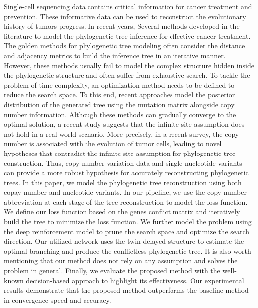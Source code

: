 {Single-cell sequencing data contains critical information for cancer treatment and prevention. These informative data can be used to reconstruct the evolutionary history of tumors progress. In recent years,  Several methods developed in the literature to model the phylogenetic tree inference for effective cancer treatment.  The golden methods for phylogenetic tree modeling often consider the distance and adjacency metrics to build the inference tree in an iterative manner. However, these methods usually fail to model the complex structure hidden inside the phylogenetic structure and often suffer from exhaustive search. To tackle the problem of time complexity, an optimization method needs to be defined to reduce the search space. To this end, recent approaches model the posterior distribution of the generated tree using the mutation matrix alongside copy number information. Although these methods can gradually converge to the optimal solution, a recent study suggests that the infinite site assumption does not hold in a real-world scenario. More precisely, in a recent survey, the copy number is associated with the evolution of tumor cells, leading to novel hypotheses that contradict the infinite site assumption for phylogenetic tree construction. Thus, copy number variation data and single nucleotide variants can provide a more robust hypothesis for accurately reconstructing phylogenetic trees.  
In this paper, we model the phylogenetic tree reconstruction using both copay number and nucleotide variants. In our pipeline, we use the copy number abbreviation at each stage of the tree reconstruction to model the loss function. We define our loss function based on the genes conflict matrix and iteratively build the tree to minimize the loss function. We further model the problem using the deep reinforcement model to prune the search space and optimize the search direction. Our utilized network uses the twin delayed structure to estimate the optimal branching and produce the conflictless phylogenetic tree. It is also worth mentioning that our method does not rely on any assumption and solves the problem in general. Finally, we evaluate the proposed method with the well-known decision-based approach to highlight its effectiveness. Our experimental results demonstrate that the proposed method outperforms the baseline method in convergence speed and accuracy. 
}
